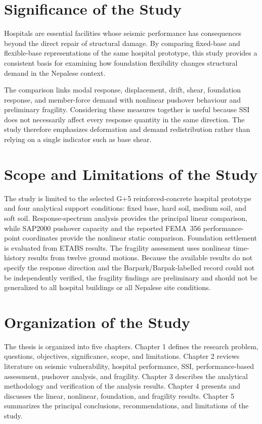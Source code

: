 \section{Significance of the Study}
Hospitals are essential facilities whose seismic performance has consequences beyond the direct repair of structural damage. By comparing fixed-base and flexible-base representations of the same hospital prototype, this study provides a consistent basis for examining how foundation flexibility changes structural demand in the Nepalese context.

The comparison links modal response, displacement, drift, shear, foundation response, and member-force demand with nonlinear pushover behaviour and preliminary fragility. Considering these measures together is useful because SSI does not necessarily affect every response quantity in the same direction. The study therefore emphasizes deformation and demand redistribution rather than relying on a single indicator such as base shear.

\section{Scope and Limitations of the Study}
The study is limited to the selected G+5 reinforced-concrete hospital prototype and four analytical support conditions: fixed base, hard soil, medium soil, and soft soil. Response-spectrum analysis provides the principal linear comparison, while SAP2000 pushover capacity and the reported FEMA~356 performance-point coordinates provide the nonlinear static comparison. Foundation settlement is evaluated from ETABS results. The fragility assessment uses nonlinear time-history results from twelve ground motions. Because the available results do not specify the response direction and the Barpark/Barpak-labelled record could not be independently verified, the fragility findings are preliminary and should not be generalized to all hospital buildings or all Nepalese site conditions.

\section{Organization of the Study}
The thesis is organized into five chapters. Chapter 1 defines the research problem, questions, objectives, significance, scope, and limitations. Chapter 2 reviews literature on seismic vulnerability, hospital performance, SSI, performance-based assessment, pushover analysis, and fragility. Chapter 3 describes the analytical methodology and verification of the analysis results. Chapter 4 presents and discusses the linear, nonlinear, foundation, and fragility results. Chapter 5 summarizes the principal conclusions, recommendations, and limitations of the study.
